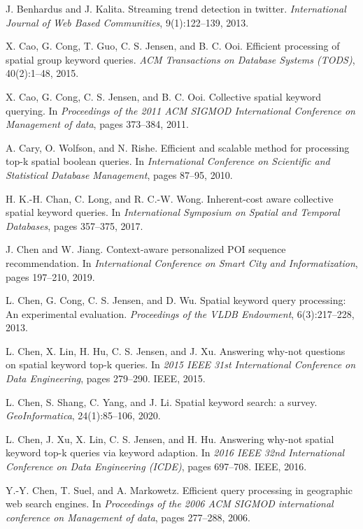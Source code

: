 \documentclass[conference]{IEEEtran}
\begin{document}
\begin{thebibliography}{00}
 J. Benhardus and J. Kalita. Streaming trend detection in twitter. \textit{International Journal of Web Based Communities}, 9(1):122–139, 2013.

 X. Cao, G. Cong, T. Guo, C. S. Jensen, and B. C. Ooi. Efficient processing of spatial group keyword queries. \textit{ACM Transactions on Database Systems (TODS)}, 40(2):1–48, 2015.

 X. Cao, G. Cong, C. S. Jensen, and B. C. Ooi. Collective spatial keyword querying. In \textit{Proceedings of the 2011 ACM SIGMOD International Conference on Management of data}, pages 373–384, 2011.

 A. Cary, O. Wolfson, and N. Rishe. Efficient and scalable method for processing top-k spatial boolean queries. In \textit{International Conference on Scientific and Statistical Database Management}, pages 87–95, 2010.

 H. K.-H. Chan, C. Long, and R. C.-W. Wong. Inherent-cost aware collective spatial keyword queries. In \textit{International Symposium on Spatial and Temporal Databases}, pages 357–375, 2017.

 J. Chen and W. Jiang. Context-aware personalized POI sequence recommendation. In \textit{International Conference on Smart City and Informatization}, pages 197–210, 2019.

 L. Chen, G. Cong, C. S. Jensen, and D. Wu. Spatial keyword query processing: An experimental evaluation. \textit{Proceedings of the VLDB Endowment}, 6(3):217–228, 2013.

 L. Chen, X. Lin, H. Hu, C. S. Jensen, and J. Xu. Answering why-not questions on spatial keyword top-k queries. In \textit{2015 IEEE 31st International Conference on Data Engineering}, pages 279–290. IEEE, 2015.

 L. Chen, S. Shang, C. Yang, and J. Li. Spatial keyword search: a survey. \textit{GeoInformatica}, 24(1):85–106, 2020.

 L. Chen, J. Xu, X. Lin, C. S. Jensen, and H. Hu. Answering why-not spatial keyword top-k queries via keyword adaption. In \textit{2016 IEEE 32nd International Conference on Data Engineering (ICDE)}, pages 697–708. IEEE, 2016.

 Y.-Y. Chen, T. Suel, and A. Markowetz. Efficient query processing in geographic web search engines. In \textit{Proceedings of the 2006 ACM SIGMOD international conference on Management of data}, pages 277–288, 2006.


\end{thebibliography}
\end{document}
